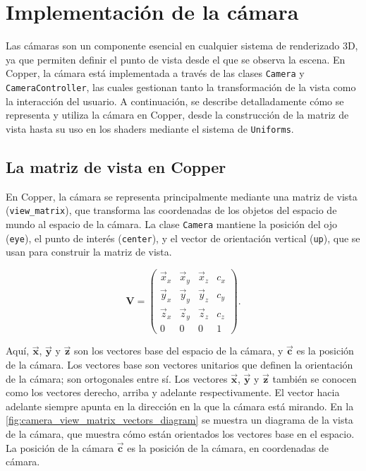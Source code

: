 \chapter{Implementación de la cámara}

Las cámaras son un componente esencial en cualquier sistema de renderizado 3D,
ya que permiten definir el punto de vista desde el que se observa la escena. En
Copper, la cámara está implementada a través de las clases \texttt{Camera} y
\texttt{CameraController}, las cuales gestionan tanto la transformación de la
vista como la interacción del usuario. A continuación, se describe
detalladamente cómo se representa y utiliza la cámara en Copper, desde la
construcción de la matriz de vista hasta su uso en los shaders mediante el
sistema de \texttt{Uniforms}.

\section{La matriz de vista en Copper}

En Copper, la cámara se representa principalmente mediante una matriz de vista
(\texttt{view\_matrix}), que transforma las coordenadas de los objetos del
espacio de mundo al espacio de la cámara. La clase \texttt{Camera} mantiene la
posición del ojo (\texttt{eye}), el punto de interés (\texttt{center}), y el
vector de orientación vertical (\texttt{up}), que se usan para construir la
matriz de vista.

\begin{equation}
    \bm{V}
    =
    \begin{pmatrix}
        \vec{x}_x & \vec{x}_y & \vec{x}_z & c_x
        \\
        \vec{y}_x & \vec{y}_y & \vec{y}_z & c_y
        \\
        \vec{z}_x & \vec{z}_y & \vec{z}_z & c_z
        \\
        0         & 0         & 0         & 1
    \end{pmatrix}.
\end{equation}

Aquí, $\vec{\bm{x}}$, $\vec{\bm{y}}$ y $\vec{\bm{z}}$ son los vectores base del
espacio de la cámara, y $\vec{\bm{c}}$ es la posición de la cámara. Los
vectores base son vectores unitarios que definen la orientación de la cámara;
son ortogonales entre sí. Los vectores $\vec{\bm{x}}$, $\vec{\bm{y}}$ y
$\vec{\bm{z}}$ también se conocen como los vectores derecho, arriba y adelante
respectivamente. El vector hacia adelante siempre apunta en la dirección en la
que la cámara está mirando. En la \ref{fig:camera_view_matrix_vectors_diagram}
se muestra un diagrama de la vista de la cámara, que muestra cómo están
orientados los vectores base en el espacio. La posición de la cámara
$\vec{\bm{c}}$ es la posición de la cámara, en coordenadas de cámara.

